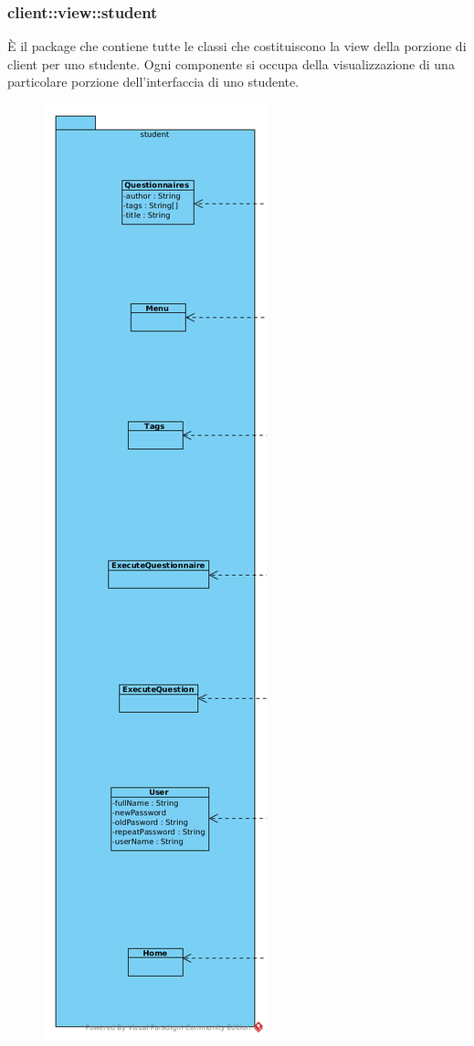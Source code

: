 \subsubsection{client::view::student}
È il package che contiene tutte le classi che costituiscono la view della porzione di client per uno studente. Ogni componente si occupa della visualizzazione di una particolare porzione dell'interfaccia di uno studente.\begin{center}
	\begin{figure}[H]
		\centering \includegraphics[scale=4, max width=\textwidth, max height=\myheight]{../img/diagrammiClassi/client/view/student.png}

\end{figure}
\end{center}

